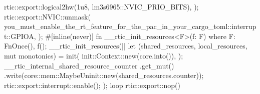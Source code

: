 {{{                    rtic::export::logical2hw(1u8, lm3s6965::NVIC_PRIO_BITS),
                );
            rtic::export::NVIC::unmask(
                you_must_enable_the_rt_feature_for_the_pac_in_your_cargo_toml::interrupt::GPIOA,
            );
            #[inline(never)]
            fn __rtic_init_resources<F>(f: F)
            where
                F: FnOnce(),
            {
                f();
            }
            __rtic_init_resources(|| {
                let (shared_resources, local_resources, mut monotonics) = init(
                    init::Context::new(core.into()),
                );
                __rtic_internal_shared_resource_counter
                    .get_mut()
                    .write(core::mem::MaybeUninit::new(shared_resources.counter));
                rtic::export::interrupt::enable();
            });
            loop {
                rtic::export::nop()
            }
        }
    }
}
